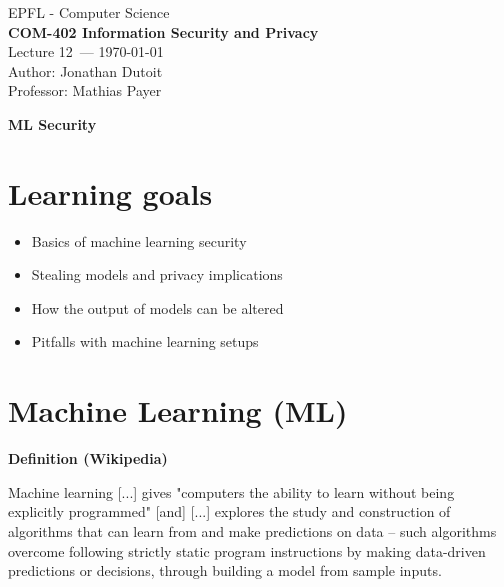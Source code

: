 \documentclass[11pt]{article}
\newcommand{\coursename}{COM-402 Information Security and Privacy}
\newcommand{\lecturenum}{12}
\newcommand{\lecturedate}{\today}
\newcommand{\professor}{Mathias Payer}
\begin{document}
\begin{center}
  {\large EPFL - Computer Science} \\[0.5em]
  {\Large \textbf{\coursename}} \\[0.5em]
  {\large Lecture \lecturenum\ --- \lecturedate} \\[0.5em]
  {\large Author: Jonathan Dutoit} \\[0.5em]
  {\large Professor: \professor} \\[0.5em]
\end{center}

\vspace{2cm}

\begin{center}
  {\LARGE \textbf{ML Security}}
\end{center}

\vspace{1cm}

\section*{Learning goals}
\begin{itemize}
	\item Basics of machine learning security
	\item Stealing models and privacy implications
	\item How the output of models can be altered
	\item Pitfalls with machine learning setups
\end{itemize}

\section*{Machine Learning (ML)}

\begin{tcolorbox}[
  colback=gray!15,     %
  colframe=black!50,    %
  boxrule=1pt,       %
  arc=3mm,             %
  left=4mm, right=4mm, top=2mm, bottom=2mm %
]
\textbf{Definition (Wikipedia)}

\vspace{0.3cm}

Machine learning [...] gives "computers the ability to learn without being explicitly programmed" [and] [...] explores the study and construction of algorithms that can learn from and make predictions on data – such algorithms overcome following strictly static program instructions by making data-driven predictions or decisions, through building a model from sample inputs.
\end{tcolorbox}
\end{document}

